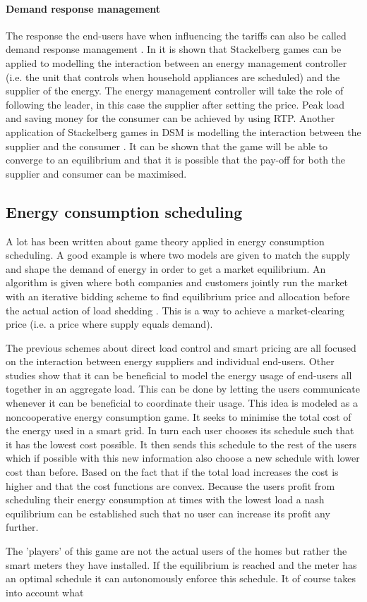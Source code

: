 \paragraph{Demand response management}
The response the end-users have when influencing the tariffs can also be called demand response management \cite{MaharjanZhuZhangEtAl2013}.
In \cite{ChenKishoreSnyder2011} it is shown that Stackelberg games can be applied to modelling the interaction between an energy management controller (i.e. the unit that controls when household appliances are scheduled) and the supplier of the energy. The energy management controller will take the role of following the leader, in this case the supplier after setting the price. Peak load and saving money for the consumer can be achieved by using RTP. Another application of Stackelberg games in DSM is modelling the interaction between the supplier and the consumer \cite{MaharjanZhuZhangEtAl2013}. It can be shown that the game will be able to converge to an equilibrium and that it is possible that the pay-off for both the supplier and consumer can be maximised. 

\subsection{Energy consumption scheduling}
A lot has been written about game theory applied in energy consumption scheduling. A good example is \cite{ChenLiLowEtAl2010} where two models are given to match the supply and shape the demand of energy in order to get a market equilibrium. An algorithm is given where both companies and customers jointly run the market with an iterative bidding scheme to find equilibrium price and allocation before the actual action of load shedding \cite{ChenLiLowEtAl2010}. This is a way to achieve a market-clearing price (i.e. a price where supply equals demand).

The previous schemes about direct load control and smart pricing are all focused on the interaction between energy suppliers and individual end-users. Other studies show \cite{Mohsenian-RadWongJatskevichEtAl2010a} that it can be beneficial to model the energy usage of end-users all together in an aggregate load. This can be done by letting the users communicate whenever it can be beneficial to coordinate their usage. This idea is modeled as a noncooperative energy consumption game. It seeks to minimise the total cost of the energy used in a smart grid. In turn each user chooses its schedule such that it has the lowest cost possible. It then sends this schedule to the rest of the users which if possible with this new information also choose a new schedule with lower cost than before. Based on the fact that if the total load increases the cost is higher and that the cost functions are convex. Because the users profit from scheduling their energy consumption at times with the lowest load a nash equilibrium can be established such that no user can increase its profit any further. \cite{Mohsenian-RadLeon-Garcia2010}

The 'players' of this game are not the actual users of the homes but rather the smart meters they have installed. If the equilibrium is reached and the meter has an optimal schedule it can autonomously enforce this schedule. It of course takes into account what 

